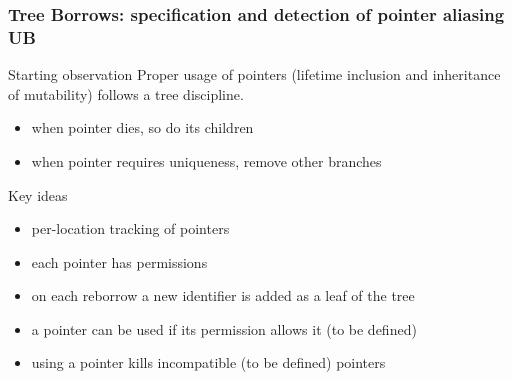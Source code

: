 \begin{frame}[t]
    \frametitle{Tree Borrows: specification and detection of pointer aliasing UB}
    \begin{alertblock}{Starting observation}
        Proper usage of pointers (lifetime inclusion and inheritance of mutability) follows a tree discipline.
        \begin{itemize}
            \item when pointer dies, so do its children
            \item when pointer requires uniqueness, remove other branches
        \end{itemize}
    \end{alertblock}
    \begin{block}{Key ideas}
        \begin{itemize}
            \item per-location tracking of pointers
            \item each pointer has permissions
            \item on each reborrow a new identifier is added as a leaf of the tree
            \item a pointer can be used if its permission allows it (to be defined)
            \item using a pointer kills incompatible (to be defined) pointers
        \end{itemize}
    \end{block}
\end{frame}

